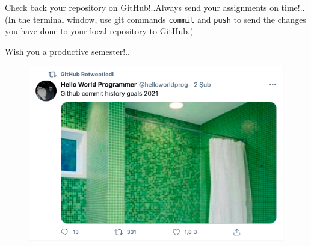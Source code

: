 \documentclass[
  12pt,
]{article}
\begin{document}
Check back your repository on GitHub!..Always send your assignments on
time!..(In the terminal window, use git commands \texttt{commit} and
\texttt{push} to send the changes you have done to your local repository
to GitHub.)

Wish you a productive semester!..

\begin{figure}
\includegraphics[width=1\linewidth]{images/github3} \end{figure}
\end{document}
